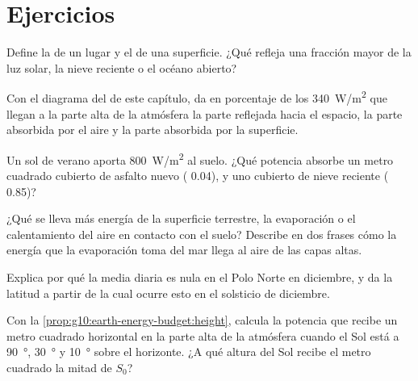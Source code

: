 \section{Ejercicios}

\begin{exercise}[$\star$]\label{exo:g10:earth-energy-budget:1}
Define la  de un lugar y el  de una superficie. ¿Qué refleja
una fracción mayor de la luz solar, la nieve reciente o el océano abierto?
\end{exercise}

\begin{exercise}[$\star$]\label{exo:g10:earth-energy-budget:2}
Con el diagrama del  de este capítulo, da en porcentaje de
los \qty{340}{W/m^2} que llegan a la parte alta de la atmósfera la parte
reflejada hacia el espacio, la parte absorbida por el aire y la parte
absorbida por la superficie.
\end{exercise}

\begin{exercise}[$\star$]\label{exo:g10:earth-energy-budget:3}
Un sol de verano aporta \qty{800}{W/m^2} al suelo. ¿Qué potencia absorbe un
metro cuadrado cubierto de asfalto nuevo ( 0.04), y uno cubierto de
nieve reciente ( 0.85)?
\end{exercise}

\begin{exercise}[$\star$]\label{exo:g10:earth-energy-budget:4}
¿Qué se lleva más energía de la superficie terrestre, la evaporación o el
calentamiento del aire en contacto con el suelo? Describe en dos frases cómo
la energía que la evaporación toma del mar llega al aire de las capas altas.
\end{exercise}

\begin{exercise}[$\star$]\label{exo:g10:earth-energy-budget:5}
Explica por qué la  media diaria es nula en el Polo Norte en
diciembre, y da la latitud a partir de la cual ocurre esto en el solsticio
de diciembre.
\end{exercise}

\begin{exercise}[$\star\star$]\label{exo:g10:earth-energy-budget:6}
Con la \cref{prop:g10:earth-energy-budget:height}, calcula la potencia que
recibe un metro cuadrado horizontal en la parte alta de la atmósfera cuando
el Sol está a \qty{90}{\degree}, \qty{30}{\degree} y \qty{10}{\degree} sobre
el horizonte. ¿A qué altura del Sol recibe el metro cuadrado la mitad de
$S_0$?
\end{exercise}

